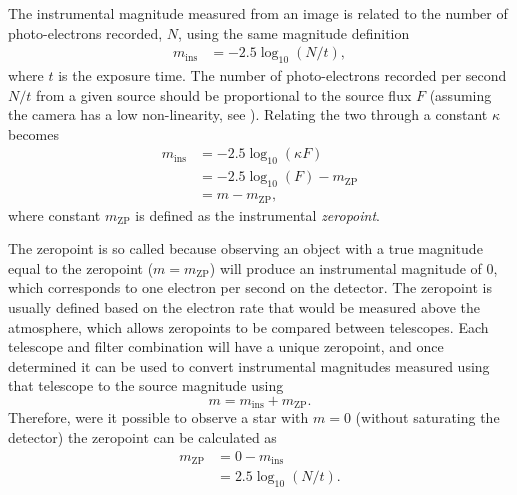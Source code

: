 \begin{colsection}
\begin{colsection}
The instrumental magnitude measured from an image is related to the number of photo-electrons recorded, $N$, using the same magnitude definition
%
\begin{equation}
    \begin{split}
        m_\text{ins} & = -2.5 \log_{10}(N/t),
    \end{split}
    \label{eq:ins_mag}
\end{equation}
%
where $t$ is the exposure time. The number of photo-electrons recorded per second $N/t$ from a given source should be proportional to the source flux $F$ (assuming the camera has a low non-linearity, see ). Relating the two through a constant $\kappa$  becomes
%
\begin{equation}
    \begin{split}
        m_\text{ins} & = -2.5 \log_{10}\left(\kappa F\right) \\
                     & = -2.5 \log_{10}\left(F\right) - m_\text{ZP}    \\
                     & = m - m_\text{ZP},
    \end{split}
    \label{eq:ins_mag2}
\end{equation}
%
where constant $m_\text{ZP}$ is defined as the instrumental \emph{zeropoint}.

The zeropoint is so called because observing an object with a true magnitude equal to the zeropoint ($m = m_\text{ZP}$) will produce an instrumental magnitude of 0, which corresponds to one electron per second on the detector. The zeropoint is usually defined based on the electron rate that would be measured above the atmosphere, which allows zeropoints to be compared between telescopes. Each telescope and filter combination will have a unique zeropoint, and once determined it can be used to convert instrumental magnitudes measured using that telescope to the source magnitude using
%
\begin{equation}
    m = m_\text{ins} + m_\text{ZP}.
    \label{eq:zp}
\end{equation}
%
Therefore, were it possible to observe a star with $m=0$ (without saturating the detector) the zeropoint can be calculated as
%
\begin{equation}
    \begin{split}
        m_\text{ZP} & = 0 - m_\text{ins} \\
                    & = 2.5 \log_{10}(N/t).
    \end{split}
    \label{eq:zp2}
\end{equation}


\end{colsection}
\end{colsection}
